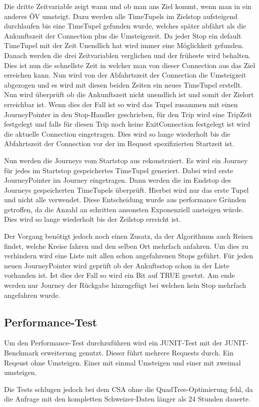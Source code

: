 Die dritte Zeitvariable zeigt wann und ob man ans Ziel kommt, wenn man in ein anderes ÖV umsteigt. Dazu werden alle TimeTupels im Zielstop aufsteigend durchlaufen bis eine TimeTupel gefunden wurde, welches später abfährt als die Ankunftszeit der Connection plus die Umsteigezeit. Da jeder Stop ein default TimeTupel mit der Zeit Unendlich hat wird immer eine Möglichkeit gefunden. 
Danach werden die drei Zeitvariablen verglichen und der früheste wird behalten. Dies ist nun die schnellste Zeit in welcher man von dieser Connection aus das Ziel erreichen kann. Nun wird von der Abfahrtszeit der Connection die Umsteigzeit abgezogen und es wird mit diesen beiden Zeiten ein neues TimeTupel erstellt. Nun wird überprüft ob die Ankunftszeit nicht unendlich ist und somit der Zielort erreichbar ist. Wenn dies der Fall ist so wird das Tupel zusammen mit einen JourneyPointer in den Stop-Handler geschrieben, für den Trip wird eine TripZeit festgelegt und falls für diesen Trip noch keine ExitConnection festgelegt ist wird die aktuelle Connection eingetragen. Dies wird so lange wiederholt bis die Abfahrtszeit der Connection vor der im Request spezifizierten Startzeit ist.
\newline


Nun werden die Journeys vom Startstop aus rekonstruiert. Es wird ein Journey für jedes im Startstop gespeichertes TimeTupel generiert. Dabei wird erste JourneyPointer im Journey eingetragen. Dann werden die im Endstop des Journeys gespeicherten TimeTupels überprüft. Hierbei wird nur das erste Tupel und nicht alle verwendet. Diese Entscheidung wurde aus performance Gründen getroffen, da die Anzahl an schritten ansonsten Exponenziell ansteigen würde. Dies wird so lange wiederholt bis der Zeilstop erreicht ist. 
\newline


Der Vorgang benötigt jedoch noch einen Zusatz, da der Algorithmus auch Reisen findet, welche Kreise fahren und den selben Ort mehrfach anfahren. Um dies zu verhindern wird eine Liste mit allen schon angefahrenen Stops geführt. Für jeden neuen JourneyPointer wird geprüft ob der Ankuftsstop schon in der Liste vorhanden ist. Ist dies der Fall so wird ein Bit auf TRUE gesetzt. Am ende werden nur Journey der Rückgabe hinzugefügt bei welchen kein Stop mehrfach angefahren wurde.

\subsection{Performance-Test}
Um den Performance-Test durchzuführen wird ein JUNIT-Test mit der JUNIT-Benchmark erweiterung genutzt. Dieser führt mehrere Requests durch. Ein Reqeust ohne Umsteigen. Einer mit einmal Umsteigen und einer mit zweimal umsteigen.
\newline


Die Tests schlugen jedoch bei dem CSA ohne die QuadTree-Optimierung fehl, da die Anfrage mit den kompletten Schweizer-Daten länger als 24 Stunden dauerte.




